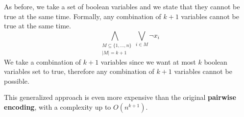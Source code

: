 As before, we take a set of boolean variables and we state that they cannot be true at the same time. Formally, any combination of $k+1$ variables cannot be
true at the same time. 
$$\bigwedge_{\begin{aligned} & M \subseteq \{1, \dots, n\} \\ &  |M| = k+1 \end{aligned}} \bigvee_{i \in M} \neg x_i$$
We take a combination of $k+1$ variables since we want at most $k$ boolean variables set to true, therefore any combination of $k + 1$ variables cannot be 
possible.

This generalized approach is even more expensive than the original \textbf{pairwise encoding}, with a complexity up to $O(n^{k+1})$.